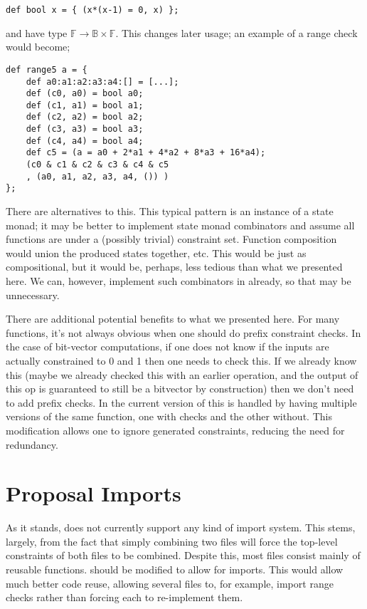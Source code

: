 \documentclass[
    9pt,            
    techreport,       
    affiltop,       
]{art}
\begin{document}
\begin{verbatim}
def bool x = { (x*(x-1) = 0, x) };
\end{verbatim}

and have type $\mathbb{F} \rightarrow \mathbb{B} \times \mathbb{F}$. This changes later usage; an example of a range check would become;

\begin{verbatim}
def range5 a = {
    def a0:a1:a2:a3:a4:[] = [...];
    def (c0, a0) = bool a0;
    def (c1, a1) = bool a1;
    def (c2, a2) = bool a2;
    def (c3, a3) = bool a3;
    def (c4, a4) = bool a4;
    def c5 = (a = a0 + 2*a1 + 4*a2 + 8*a3 + 16*a4);
    (c0 & c1 & c2 & c3 & c4 & c5
    , (a0, a1, a2, a3, a4, ()) )
};
\end{verbatim}

There are alternatives to this. This typical pattern is an instance of a state monad; it may be better to implement state monad combinators and assume all functions are under a (possibly trivial) constraint set. Function composition would union the produced states together, etc. This would be just as compositional, but it would be, perhaps, less tedious than what we presented here. We can, however, implement such combinators in \VampIR{} already, so that may be unnecessary.

There are additional potential benefits to what we presented here. For many functions, it's not always obvious when one should do prefix constraint checks. In the case of bit-vector computations, if one does not know if the inputs are actually constrained to 0 and 1 then one needs to check this. If we already know this (maybe we already checked this with an earlier operation, and the output of this op is guaranteed to still be a bitvector by construction) then we don't need to add prefix checks. In the current version of \VampIR{} this is handled by having multiple versions of the same function, one with checks and the other without. This modification allows one to ignore generated constraints, reducing the need for redundancy.

\section{Proposal \VampIR{} Imports}
\label{sec:imports}

As it stands, \VampIR{} does not currently support any kind of import system. This stems, largely, from the fact that simply combining two files will force the top-level constraints of both files to be combined. Despite this, most \VampIR{} files consist mainly of reusable functions. \VampIR{} should be modified to allow for imports. This would allow much better code reuse, allowing several files to, for example, import range checks rather than forcing each to re-implement them.
\end{document}
